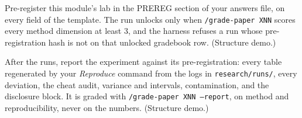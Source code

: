 \begin{problem}\label{prob:B5}
Pre-register this module's lab in the PREREG section of your answers file,
on every field of the template. The run unlocks only when
\texttt{/grade-paper XNN} scores every method dimension at least 3, and the
harness refuses a run whose pre-registration hash is not on that unlocked
gradebook row. (Structure demo.)
\end{problem}

\begin{problem}\label{prob:B6}
After the runs, report the experiment against its pre-registration: every table
regenerated by your \emph{Reproduce} command from the logs in
\texttt{research/runs/}, every deviation, the cheat audit, variance and
intervals, contamination, and the disclosure block. It is graded with
\texttt{/grade-paper XNN --report}, on method and reproducibility, never on
the numbers. (Structure demo.)
\end{problem}


